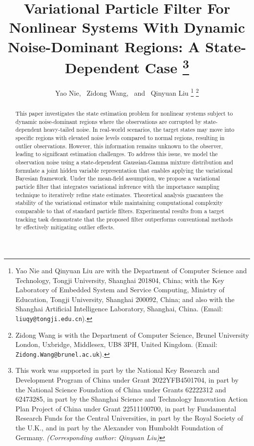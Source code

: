 \documentclass[10pt,twocolumn,twoside]{IEEEtran}
\begin{document}

\title{{Variational Particle Filter For Nonlinear Systems With Dynamic Noise-Dominant Regions: A State-Dependent Case
}\thanks{This work was supported in part by the National Key Research and Development Program of China under Grant 2022YFB4501704, in
part by the National Science Foundation of China under Grants
62222312 and 62473285, in part by the Shanghai Science and Technology Innovation Action Plan Project of China under Grant 22511100700, in part by Fundamental Research Funds for the Central Universities, in part by the Royal Society of the U.K., and in part by the Alexander von Humboldt Foundation of Germany. {\it (Corresponding author: Qinyuan Liu)}}
}

\author{Yao Nie, ~Zidong Wang, ~and ~Qinyuan Liu
\thanks{Yao Nie and Qinyuan Liu are with the Department of Computer Science and Technology, Tongji University, Shanghai 201804, China; with the Key Laboratory of Embedded System and Service Computing, Ministry of Education, Tongji University, Shanghai 200092, China; and also with the Shanghai Artificial Intelligence Laboratory, Shanghai, China. (Email: {\tt liuqy@tongji.edu.cn}).}
\thanks{Zidong Wang is with the Department of Computer Science, Brunel University London, Uxbridge, Middlesex, UB8 3PH, United Kingdom. (Email: {\tt Zidong.Wang@brunel.ac.uk}).}
}

 {} \maketitle

\begin{abstract}
This paper investigates the state estimation problem for nonlinear systems subject to dynamic noise-dominant regions where the observations are corrupted by state-dependent heavy-tailed noise. In real-world scenarios, the target states may move into specific regions with elevated noise levels compared to normal regions, resulting in outlier observations. However, this information remains unknown to the observer, leading to significant estimation challenges. To address this issue, we model the observation noise using a state-dependent Gaussian-Gamma mixture distribution and formulate a joint hidden variable representation that enables applying the variational Bayesian framework. Under the mean-field assumption, we propose a variational particle filter that integrates variational inference with the importance sampling technique to iteratively refine state estimates. Theoretical analysis guarantees the stability of the variational estimator while maintaining computational complexity comparable to that of standard particle filters. Experimental results from a target tracking task demonstrate that the proposed filter outperforms conventional methods by effectively mitigating outlier effects.
\end{abstract}
\end{document}
